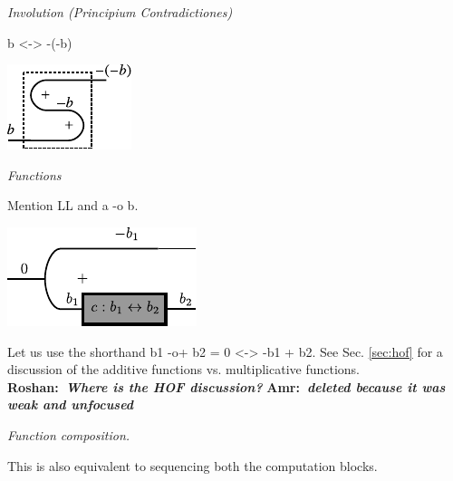 \documentclass[preprint]{sigplanconf}
\newcommand{\xcomment}[2]{\textbf{#1:~\textsl{#2}}}
\newcommand{\amr}[1]{\xcomment{Amr}{#1}}
\newcommand{\roshan}[1]{\xcomment{Roshan}{#1}}
\begin{document}

\emph{Involution (Principium Contradictiones)}

{{b <-> -(-b)}}

\begin{center}
  \includegraphics{diagrams/double_neg.pdf}
\end{center}

\emph{Functions}

Mention LL and {{a -o b}}.

\begin{center}
  \includegraphics{diagrams/function.pdf}
\end{center}

Let us use the shorthand {{b1 -o+ b2 = 0 <-> -b1 + b2}}. See
Sec. \ref{sec:hof} for a discussion of the additive functions
vs. multiplicative functions. 
\roshan{Where is the HOF discussion?}
\amr{deleted because it was weak and unfocused}

\emph{Function composition.}

\begin{multicols}{2}

\end{multicols}
This is also equivalent to sequencing both the computation blocks. 
\end{document}
